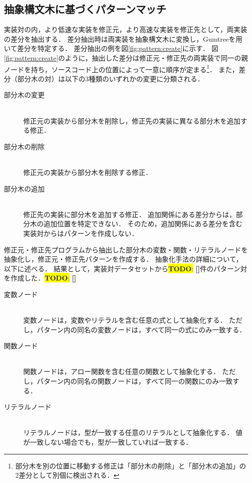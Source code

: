 \documentclass[11pt]{jreport}
\newcommand{\todo}[1]{\colorbox{yellow}{{\bf TODO}:}{\color{red} {\textbf{[#1]}}}}
\begin{document}
\subsection{抽象構文木に基づくパターンマッチ}


実装対の内，より低速な実装を修正元，より高速な実装を修正先として，両実装の差分を抽出する．
差分抽出時は両実装を抽象構文木に変換し，Gumtree\cite{Falleri_2014}を用いて差分を特定する．
差分抽出の例を図\ref{fig:pattern:create}に示す．
図\ref{fig:pattern:create}のように，抽出した差分は修正元・修正先の両実装で同一の親ノードを持ち，ソースコード上の位置によって一意に順序が定まる\footnote{部分木を別の位置に移動する修正は「部分木の削除」と「部分木の追加」の2差分として別個に検出される．}．
また，差分（部分木の対）は以下の3種類のいずれかの変更に分類される．


\begin{description}

\item[部分木の変更]\mbox{}\\
修正元の実装から部分木を削除し，修正先の実装に異なる部分木を追加する修正．

\item[部分木の削除]\mbox{}\\
修正元の実装から部分木を削除する修正．

\item[部分木の追加]\mbox{}\\
修正先の実装に部分木を追加する修正．
追加関係にある差分からは，部分木の追加位置を特定できない．
そのため，追加関係にある差分を含む実装対からはパターンを作成しない．

\end{description}


修正元・修正先プログラムから抽出した部分木の変数・関数・リテラルノードを抽象化し，修正元・修正先パターンを作成する．
抽象化手法の詳細について，以下に述べる．
結果として，実装対データセットから\todo{}件のパターン対を作成した．\todo{}


\begin{description}

\item[変数ノード]\mbox{}\\
変数ノードは，変数やリテラルを含む任意の式として抽象化する．
ただし，パターン内の同名の変数ノードは，すべて同一の式にのみ一致する．

\item[関数ノード]\mbox{}\\
関数ノードは，アロー関数を含む任意の関数として抽象化する．
ただし，パターン内の同名の関数ノードは，すべて同一の関数にのみ一致する．

\item[リテラルノード]\mbox{}\\
リテラルノードは，型が一致する任意のリテラルとして抽象化する．
値が一致しない場合でも，型が一致していれば一致する．

\end{description}
\end{document}
